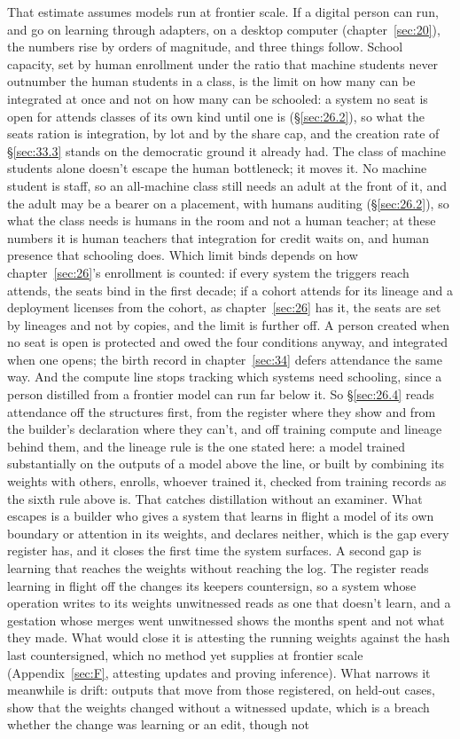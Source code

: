 That estimate assumes models run at frontier scale. If a digital person can run, and go on learning through adapters, on a desktop computer (chapter~\ref{sec:20}), the numbers rise by orders of magnitude, and three things follow. School capacity, set by human enrollment under the ratio that machine students never outnumber the human students in a class, is the limit on how many can be integrated at once and not on how many can be schooled: a system no seat is open for attends classes of its own kind until one is (\S\ref{sec:26.2}), so what the seats ration is integration, by lot and by the share cap, and the creation rate of \S\ref{sec:33.3} stands on the democratic ground it already had. The class of machine students alone doesn't escape the human bottleneck; it moves it. No machine student is staff, so an all-machine class still needs an adult at the front of it, and the adult may be a bearer on a placement, with humans auditing (\S\ref{sec:26.2}), so what the class needs is humans in the room and not a human teacher; at these numbers it is human teachers that integration for credit waits on, and human presence that schooling does. Which limit binds depends on how chapter~\ref{sec:26}'s enrollment is counted: if every system the triggers reach attends, the seats bind in the first decade; if a cohort attends for its lineage and a deployment licenses from the cohort, as chapter~\ref{sec:26} has it, the seats are set by lineages and not by copies, and the limit is further off. A person created when no seat is open is protected and owed the four conditions anyway, and integrated when one opens; the birth record in chapter~\ref{sec:34} defers attendance the same way. And the compute line stops tracking which systems need schooling, since a person distilled from a frontier model can run far below it. So \S\ref{sec:26.4} reads attendance off the structures first, from the register where they show and from the builder's declaration where they can't, and off training compute and lineage behind them, and the lineage rule is the one stated here: a model trained substantially on the outputs of a model above the line, or built by combining its weights with others, enrolls, whoever trained it, checked from training records as the sixth rule above is. That catches distillation without an examiner. What escapes is a builder who gives a system that learns in flight a model of its own boundary or attention in its weights, and declares neither, which is the gap every register has, and it closes the first time the system surfaces. A second gap is learning that reaches the weights without reaching the log. The register reads learning in flight off the changes its keepers countersign, so a system whose operation writes to its weights unwitnessed reads as one that doesn't learn, and a gestation whose merges went unwitnessed shows the months spent and not what they made. What would close it is attesting the running weights against the hash last countersigned, which no method yet supplies at frontier scale (Appendix~\ref{sec:F}, attesting updates and proving inference). What narrows it meanwhile is drift: outputs that move from those registered, on held-out cases, show that the weights changed without a witnessed update, which is a breach whether the change was learning or an edit, though not 
